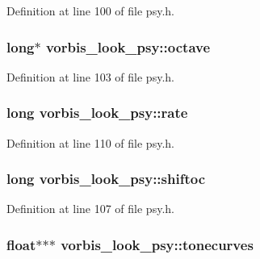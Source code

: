 Definition at line 100 of file psy.\+h.

\subsubsection[{\texorpdfstring{octave}{octave}}]{\setlength{\rightskip}{0pt plus 5cm}long$\ast$ vorbis\+\_\+look\+\_\+psy\+::octave}\hypertarget{structvorbis__look__psy_a3bd4830be6d4d265ab06dbbc26926648}{}\label{structvorbis__look__psy_a3bd4830be6d4d265ab06dbbc26926648}


Definition at line 103 of file psy.\+h.

\subsubsection[{\texorpdfstring{rate}{rate}}]{\setlength{\rightskip}{0pt plus 5cm}long vorbis\+\_\+look\+\_\+psy\+::rate}\hypertarget{structvorbis__look__psy_ab670c918ba2eea41e7dfed9d3ac33294}{}\label{structvorbis__look__psy_ab670c918ba2eea41e7dfed9d3ac33294}


Definition at line 110 of file psy.\+h.

\subsubsection[{\texorpdfstring{shiftoc}{shiftoc}}]{\setlength{\rightskip}{0pt plus 5cm}long vorbis\+\_\+look\+\_\+psy\+::shiftoc}\hypertarget{structvorbis__look__psy_a97ab9b72727138cef93f0b930bc47568}{}\label{structvorbis__look__psy_a97ab9b72727138cef93f0b930bc47568}


Definition at line 107 of file psy.\+h.

\subsubsection[{\texorpdfstring{tonecurves}{tonecurves}}]{\setlength{\rightskip}{0pt plus 5cm}float$\ast$$\ast$$\ast$ vorbis\+\_\+look\+\_\+psy\+::tonecurves}\hypertarget{structvorbis__look__psy_af99844cac8795514329522d9855d0494}{}\label{structvorbis__look__psy_af99844cac8795514329522d9855d0494}


